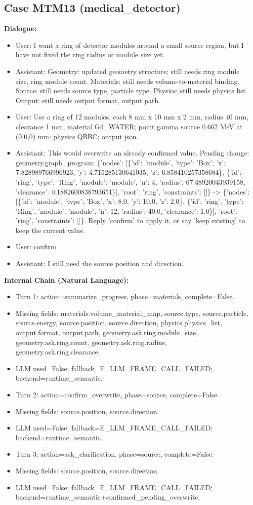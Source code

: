 \documentclass[11pt]{ctexart}
\begin{document}
\subsection{Case MTM13 (medical\_detector)}
\textbf{Dialogue:}
\begin{itemize}
\item User: I want a ring of detector modules around a small source region, but I have not fixed the ring radius or module size yet.
\item Assistant: Geometry: updated geometry structure; still needs ring module size, ring module count. Materials: still needs volume-to-material binding. Source: still needs source type, particle type. Physics: still needs physics list. Output: still needs output format, output path.
\item User: Use a ring of 12 modules, each 8 mm x 10 mm x 2 mm, radius 40 mm, clearance 1 mm, material G4\_WATER; point gamma source 0.662 MeV at (0,0,0) mm; physics QBBC; output json.
\item Assistant: This would overwrite an already confirmed value. Pending change: geometry.graph\_program: \{'nodes': [\{'id': 'module', 'type': 'Box', 'x': 7.828989766996923, 'y': 4.715285130641035, 'z': 6.858410257358684\}, \{'id': 'ring', 'type': 'Ring', 'module': 'module', 'n': 4, 'radius': 67.48920043939158, 'clearance': 0.1882600838793651\}], 'root': 'ring', 'constraints': []\} -> \{'nodes': [\{'id': 'module', 'type': 'Box', 'x': 8.0, 'y': 10.0, 'z': 2.0\}, \{'id': 'ring', 'type': 'Ring', 'module': 'module', 'n': 12, 'radius': 40.0, 'clearance': 1.0\}], 'root': 'ring', 'constraints': []\}. Reply 'confirm' to apply it, or say 'keep existing' to keep the current value.
\item User: confirm
\item Assistant: I still need the source position and direction.
\end{itemize}
\textbf{Internal Chain (Natural Language):}
\begin{itemize}
\item Turn 1: action=summarize\_progress, phase=materials, complete=False.
\item Missing fields: materials.volume\_material\_map, source.type, source.particle, source.energy, source.position, source.direction, physics.physics\_list, output.format, output.path, geometry.ask.ring.module\_size, geometry.ask.ring.count, geometry.ask.ring.radius, geometry.ask.ring.clearance.
\item LLM used=False; fallback=E\_LLM\_FRAME\_CALL\_FAILED; backend=runtime\_semantic.
\item Turn 2: action=confirm\_overwrite, phase=source, complete=False.
\item Missing fields: source.position, source.direction.
\item LLM used=False; fallback=E\_LLM\_FRAME\_CALL\_FAILED; backend=runtime\_semantic.
\item Turn 3: action=ask\_clarification, phase=source, complete=False.
\item Missing fields: source.position, source.direction.
\item LLM used=False; fallback=E\_LLM\_FRAME\_CALL\_FAILED; backend=runtime\_semantic+confirmed\_pending\_overwrite.
\end{itemize}
\end{document}
